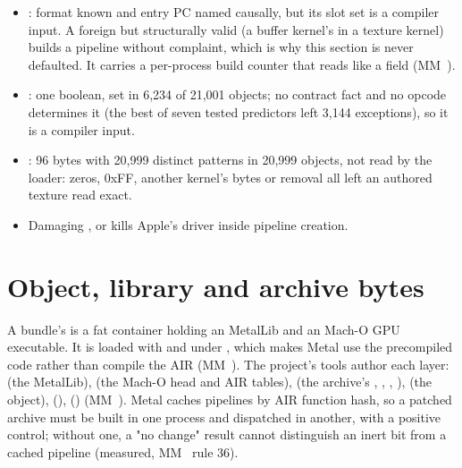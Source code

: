 \begin{itemize}
\item {}: format known and entry PC named causally, but its slot set is a compiler input. A foreign but
  structurally valid  (a buffer kernel's in a texture kernel) builds a pipeline without complaint, which is
  why this section is never defaulted. It carries a per-process build counter that reads like a field (MM~).
\item {}: one boolean, set in 6,234 of 21,001 objects; no contract fact and no opcode determines it (the
  best of seven tested predictors left 3,144 exceptions), so it is a compiler input.
\item {}: 96 bytes with 20,999 distinct patterns in 20,999 objects, not read by the loader: zeros, 0xFF,
  another kernel's bytes or removal all left an authored texture read exact.
\item Damaging ,  or  kills Apple's driver inside pipeline creation.
\end{itemize}

\section{Object, library and archive bytes}\label{sec:object-library-archive}

A bundle's  is a fat container holding an  MetalLib and an  Mach-O
GPU executable. It is loaded with  and  under
, which makes Metal use the precompiled code rather than compile the AIR
(MM~). The project's tools author each layer:  (the MetalLib),  (the Mach-O head and
AIR tables),  (the archive's , , , ), 
(the object),  (),  () (MM~). Metal caches pipelines by AIR
function hash, so a patched archive must be built in one process and dispatched in another, with a positive control;
without one, a "no change" result cannot distinguish an inert bit from a cached pipeline (measured, MM~ rule 36).

